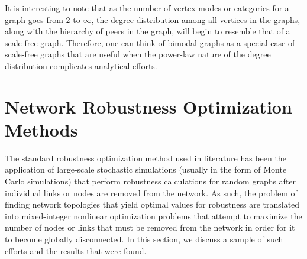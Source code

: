 \documentclass[doc]{apa}%
\begin{document}
It is interesting to note that as the number of vertex modes or categories for a graph goes from $2$ to $\infty$, the degree distribution among all vertices in the graphs, along with the hierarchy of peers in the graph, will begin to resemble that of a scale-free graph. Therefore, one can think of bimodal graphs as a special case of scale-free graphs that are useful when the power-law nature of the degree distribution complicates analytical efforts.

\section{Network Robustness Optimization Methods}

The standard robustness optimization method used in literature has been the application of large-scale stochastic simulations (usually in the form of Monte Carlo simulations) that perform robustness calculations for random graphs after individual links or nodes are removed from the network. As such, the problem of finding network topologies that yield optimal values for robustness are translated into mixed-integer nonlinear optimization problems that attempt to maximize the number of nodes or links that must be removed from the network in order for it to become globally disconnected. In this section, we discuss a sample of such efforts and the results that were found.
\end{document}
